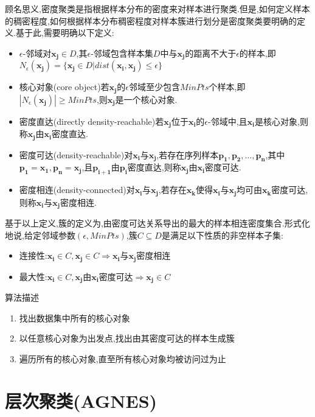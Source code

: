 顾名思义,密度聚类是指根据样本分布的密度来对样本进行聚类.但是,如何定义样本的稠密程度,如何根据样本分布稠密程度对样本簇进行划分是密度聚类要明确的定义.基于此,需要明确以下定义:
\begin{itemize}
\item $\epsilon$-邻域对$\mathbf{x_j}\in D$,其$\epsilon$-邻域包含样本集$D$中与$\mathbf{x_j}$的距离不大于$\epsilon$的样本,即$N_{\epsilon}(\mathbf{x_j})=\{\mathbf{x_j}\in D|dist(\mathbf{x_i,x_j})\le\epsilon\}$
\item 核心对象(core object)若$\mathbf{x_j}$的$\epsilon$邻域至少包含$MinPts$个样本,即$|N_{\epsilon}(\mathbf{x_j})|\ge MinPts$,则$\mathbf{x_j}$是一个核心对象.
\item 密度直达(directly density-reachable)若$\mathbf{x_j}$位于$\mathbf{x_i}$的$\epsilon$-邻域中,且$\mathbf{x_i}$是核心对象,则称$\mathbf{x_j}$由$\mathbf{x_i}$密度直达.
\item 密度可达(density-reachable)对$\mathbf{x_i}$与$\mathbf{x_j}$,若存在序列样本$\mathbf{p_1,p_2,\dots,p_n}$,其中$\mathbf{p_1=x_1,p_n=x_j}$,且$\mathbf{p_{i+1}}$由$\mathbf{p_{i}}$密度直达,则称$\mathbf{x_j}$由$\mathbf{x_i}$密度可达.
\item 密度相连(density-connected)对$\mathbf{x_i}$与$\mathbf{x_j}$,若存在$\mathbf{x_k}$使得$\mathbf{x_i}$与$\mathbf{x_j}$均可由$\mathbf{x_k}$密度可达,则称$\mathbf{x_i}$与$\mathbf{x_j}$密度相连.
\end{itemize}

基于以上定义,簇的定义为,由密度可达关系导出的最大的样本相连密度集合.形式化地说,给定邻域参数$(\epsilon,MinPts)$,簇$C\subseteq D$是满足以下性质的非空样本子集:
\begin{itemize}
\item 连接性:$\mathbf{x_i}\in C, \mathbf{x_j}\in C\Rightarrow\mathbf{x_i}$与$\mathbf{x_j}$密度相连
\item 最大性:$\mathbf{x_i}\in C, \mathbf{x_j}$由$\mathbf{x_i}$密度可达$\Rightarrow\mathbf{x_j}\in C$
\end{itemize}

算法描述
\begin{enumerate}
\item 找出数据集中所有的核心对象
\item 以任意核心对象为出发点,找出由其密度可达的样本生成簇
\item 遍历所有的核心对象,直至所有核心对象均被访问过为止
\end{enumerate}

\section{层次聚类(AGNES)}

